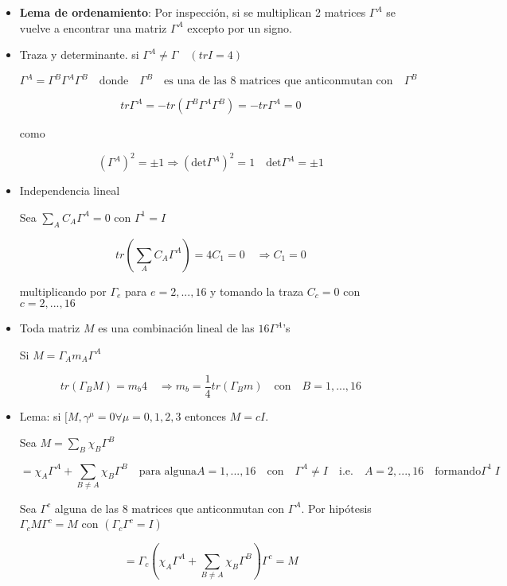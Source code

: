 \documentclass{report}
\begin{document}
\begin{itemize}

\item \textbf{Lema de ordenamiento}: Por inspección, si se multiplican 2 matrices $\Gamma^A$ se vuelve a encontrar una matriz $\Gamma^A$ excepto por un signo.


\item Traza y determinante. si $\Gamma^{A} \neq \Gamma \quad (tr I = 4)$

\[ \Gamma^A = \Gamma^B \Gamma^A \Gamma^B \quad \text{donde} \quad \Gamma^B \quad \text{es una de las 8 matrices que anticonmutan con} \quad \Gamma^B \]

\[tr \Gamma^A = -tr (\Gamma^B \Gamma^A \Gamma^B) = - tr \Gamma^A = 0\]

como

\[(\Gamma^A)^2 = \pm 1 \Rightarrow (\text{det} \Gamma^A)^2 = 1 \quad \text{det} \Gamma^A = \pm 1 \]


\item Independencia lineal

Sea $\sum_{A} C_{A} \Gamma^A = 0$ con $\Gamma^1 = I$

\[tr(\sum_{A} C_{A}\Gamma^A) = 4 C_{1} = 0 \quad \Rightarrow C_{1} = 0\]

multiplicando por $\Gamma_{e}$ para $e = 2,...,16$ y tomando la traza $C_{c} = 0$ con $c = 2,...,16$

\item Toda matriz $M$ es una combinación lineal de las $16 \Gamma^A$'s


Si $M = \Gamma_{A} m_{A} \Gamma^A$

\[tr(\Gamma_{B}M) = m_{b}4 \quad \Rightarrow m_{b} = \frac{1}{4} tr(\Gamma_{B}m) \quad \text{con} \quad B=1,...,16\]

\item Lema: si $[M, \gamma^{\mu} = 0 \forall \mu = 0, 1, 2, 3 $ entonces $M = cI$.

Sea $M = \sum _{B} \chi _{B} \Gamma^{B}$

\[= \chi_{A} \Gamma^A + \sum _{B \neq A} \chi _{B} \Gamma^B \quad \text{para alguna} A = 1,...,16 \quad \text{con} \quad \Gamma^A \neq I \quad \text{i.e.} \quad A = 2,...,16 \quad \text{formando} \Gamma^1 \ I\]

Sea $\Gamma^c$ alguna de las 8 matrices que anticonmutan con $\Gamma^A$. Por hipótesis $\Gamma_{c} M \Gamma^c = M$ con $(\Gamma_{c} \Gamma^c = I)$

\[= \Gamma_{c}(\chi _{A} \Gamma^{A} + \sum _{B \neq A} \chi _{B} \Gamma^B) \Gamma^c = M\]


\end{itemize}
\end{document}
